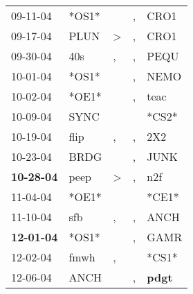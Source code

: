 \begin{supertabular}{p{0.07\textwidth}p{0.06\textwidth}p{0.02\textwidth}p{0.02\textwidth}p{0.06\textwidth}}
          09-11-04\textsuperscript{} &                            *OS1* &                  &                , &           CRO1\textsuperscript{} \\
          09-17-04\textsuperscript{} &           PLUN\textsuperscript{} &     \textgreater &                , &           CRO1\textsuperscript{} \\
          09-30-04\textsuperscript{} &            40s\textsuperscript{} &                , &                , &           PEQU\textsuperscript{} \\
          10-01-04\textsuperscript{} &                            *OS1* &                  &                , &           NEMO\textsuperscript{} \\
          10-02-04\textsuperscript{} &                            *OE1* &                  &                , &           teac\textsuperscript{} \\
          10-09-04\textsuperscript{} &           SYNC\textsuperscript{} &                  &                  &                            *CS2* \\
          10-19-04\textsuperscript{} &           flip\textsuperscript{} &                , &                , &            2X2\textsuperscript{} \\
          10-23-04\textsuperscript{} &           BRDG\textsuperscript{} &                  &                , &           JUNK\textsuperscript{} \\
 \textbf{10-28-04\textsuperscript{}} &           peep\textsuperscript{} &     \textgreater &                , &            n2f\textsuperscript{} \\
          11-04-04\textsuperscript{} &                            *OE1* &                  &                  &                            *CE1* \\
          11-10-04\textsuperscript{} &            sfb\textsuperscript{} &                , &                , &           ANCH\textsuperscript{} \\
 \textbf{12-01-04\textsuperscript{}} &                            *OS1* &                  &                , &           GAMR\textsuperscript{} \\
          12-02-04\textsuperscript{} &           fmwh\textsuperscript{} &                , &                  &                            *CS1* \\
          12-06-04\textsuperscript{} &           ANCH\textsuperscript{} &                  &                , &  \textbf{pdgt\textsuperscript{}} \\

\end{supertabular}

